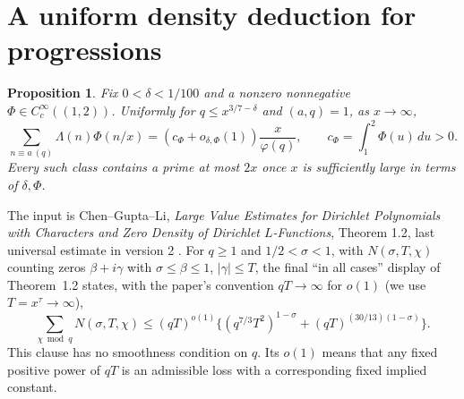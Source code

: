 \documentclass[11pt]{article}
\newtheorem{proposition}[theorem]{Proposition}
\theoremstyle{definition}
\newcommand{\ph}{\varphi}
\begin{document}
\section{A uniform density deduction for progressions}
\begin{proposition}\label{prop:ap-smooth}
Fix $0<\delta<1/100$ and a nonzero nonnegative
$\Phi\in C_c^\infty((1,2))$. Uniformly for
$q\le x^{3/7-\delta}$ and $(a,q)=1$, as $x\to\infty$,
\[
 \sum_{n\equiv a\ (q)}\Lambda(n)\Phi(n/x)
   =(c_\Phi+o_{\delta,\Phi}(1))\frac{x}{\ph(q)},\qquad
 c_\Phi=\int_1^2\Phi(u)\,du>0.
\]
Every such class contains a prime at most $2x$ once $x$ is sufficiently
large in terms of $\delta,\Phi$.
\end{proposition}
The input is Chen--Gupta--Li,
\emph{Large Value Estimates for Dirichlet Polynomials with Characters
and Zero Density of Dirichlet $L$-Functions}, Theorem 1.2, last
universal estimate in version 2 \cite{CGL}.
For $q\ge1$ and $1/2<\sigma<1$, with $N(\sigma,T,\chi)$ counting
zeros $\beta+i\gamma$ with $\sigma\le\beta\le1$, $|\gamma|\le T$,
the final ``in all cases'' display of Theorem~1.2 states, with
the paper's convention $qT\to\infty$ for $o(1)$
(we use $T=x^\tau\to\infty$),
\begin{equation}\label{eq:cgl}
 \sum_{\chi\bmod q}N(\sigma,T,\chi)
 \le(qT)^{o(1)}
  \{(q^{7/3}T^2)^{1-\sigma}+(qT)^{(30/13)(1-\sigma)}\}.
\end{equation}
This clause has no smoothness condition on $q$.
Its $o(1)$ means that any fixed positive power of $qT$ is an admissible
loss with a corresponding fixed implied constant.
\end{document}
